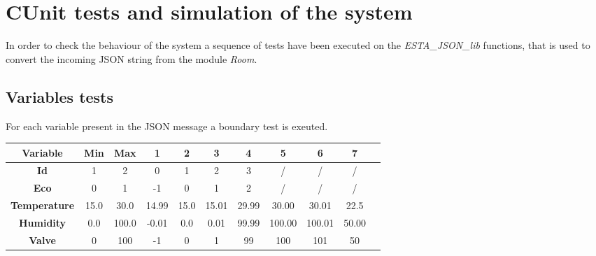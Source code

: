 \newpage
\section{CUnit tests and simulation of the system}
In order to check the behaviour of the system a sequence of tests have been executed on the \textit{ESTA\_JSON\_lib} functions, that is used to convert the incoming JSON string from the module \textit{Room}.

\subsection{Variables tests}
For each variable present in the JSON message a boundary test is exeuted.
\newline
\begin{center}
	\begin{tabular}{|| c | c | c | c | c | c | c | c | c | c | c||} 
		\hline
		Variable				& 	Min 	& Max 	& 1\degree	& 2\degree & 3\degree	& 4\degree & 5\degree	& 6\degree & 7\degree\\ 
		\hline
		\textbf{Id}				&	1 		& 2		& 0 	& 1 	& 2 	& 3 	& / 	& / 	& / \\ 
		\hline
		\textbf{Eco}			&	0 		& 1		& -1  	& 0 	& 1 	& 2 	& / 	& /		& / \\ 
		\hline
		\textbf{Temperature}	&	15.0 	& 30.0	& 14.99 & 15.0 	& 15.01 & 29.99	& 30.00 & 30.01 & 22.5 \\ 
		\hline
		\textbf{Humidity}		&	0.0		& 100.0	& -0.01	& 0.0 	& 0.01 	& 99.99 & 100.00 & 100.01 & 50.00 \\ 
		\hline
		\textbf{Valve}			&	0		& 100 	& -1 	& 0 	& 1 	& 99 	& 100 	& 101 	& 50 \\ 
		\hline
	\end{tabular}
\end{center}

